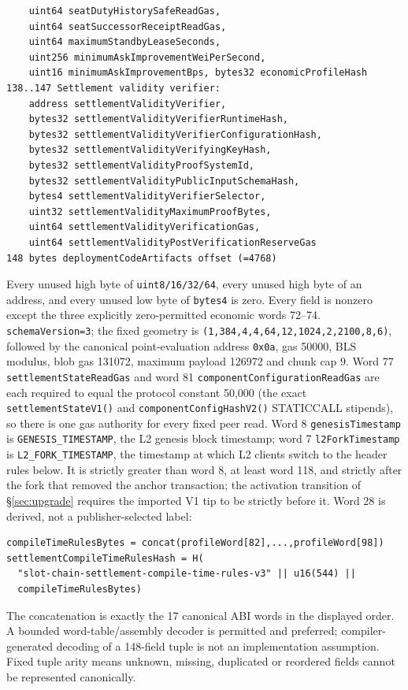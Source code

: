 \documentclass[a4paper,11pt]{article}
\newcommand{\code}[1]{\nolinkurl{#1}}
\begin{document}
\begin{verbatim}
    uint64 seatDutyHistorySafeReadGas,
    uint64 seatSuccessorReceiptReadGas,
    uint64 maximumStandbyLeaseSeconds,
    uint256 minimumAskImprovementWeiPerSecond,
    uint16 minimumAskImprovementBps, bytes32 economicProfileHash
138..147 Settlement validity verifier:
    address settlementValidityVerifier,
    bytes32 settlementValidityVerifierRuntimeHash,
    bytes32 settlementValidityVerifierConfigurationHash,
    bytes32 settlementValidityVerifyingKeyHash,
    bytes32 settlementValidityProofSystemId,
    bytes32 settlementValidityPublicInputSchemaHash,
    bytes4 settlementValidityVerifierSelector,
    uint32 settlementValidityMaximumProofBytes,
    uint64 settlementValidityVerificationGas,
    uint64 settlementValidityPostVerificationReserveGas
148 bytes deploymentCodeArtifacts offset (=4768)
\end{verbatim}
Every unused high byte of \code{uint8/16/32/64}, every unused high byte of an
address, and every unused low byte of \code{bytes4} is zero.  Every field is
nonzero except the three explicitly zero-permitted economic words 72--74.
\code{schemaVersion=3}; the fixed geometry is
\code{(1,384,4,4,64,12,1024,2,2100,8,6)}, followed by the canonical
point-evaluation address \code{0x0a}, gas 50000, BLS modulus, blob gas 131072,
maximum payload 126972 and chunk cap 9.  Word 77
\code{settlementStateReadGas} and word 81 \code{componentConfigurationReadGas}
are each required to equal the protocol constant 50,000 (the exact
\code{settlementStateV1()} and \code{componentConfigHashV2()} STATICCALL
stipends), so there is one gas authority for every fixed peer read.
Word 8 \code{genesisTimestamp} is \code{GENESIS_TIMESTAMP}, the L2 genesis
block timestamp; word 7 \code{l2ForkTimestamp} is \code{L2_FORK_TIMESTAMP},
the timestamp at which L2 clients switch to the header rules below.  It is
strictly greater than word 8, at least word 118, and strictly after the fork
that removed the anchor transaction; the activation transition of
\S\ref{sec:upgrade} requires the imported V1 tip to be strictly before it.
Word 28 is derived, not a publisher-selected label:
\begin{verbatim}
compileTimeRulesBytes = concat(profileWord[82],...,profileWord[98])
settlementCompileTimeRulesHash = H(
  "slot-chain-settlement-compile-time-rules-v3" || u16(544) ||
  compileTimeRulesBytes)
\end{verbatim}
The concatenation is exactly the 17 canonical ABI words in the displayed
order.  A bounded word-table/assembly decoder is permitted and preferred;
compiler-generated decoding of a 148-field tuple is not an implementation
assumption.  Fixed tuple arity means unknown, missing, duplicated or reordered
fields cannot be represented canonically.
\end{document}
